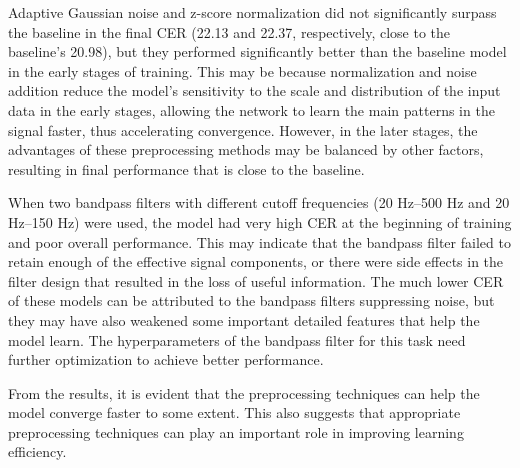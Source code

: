 Adaptive Gaussian noise and z-score normalization did not significantly surpass the baseline in the final CER (22.13 and 22.37, respectively, close to the baseline's 20.98), but they performed significantly better than the baseline model in the early stages of training. This may be because normalization and noise addition reduce the model's sensitivity to the scale and distribution of the input data in the early stages, allowing the network to learn the main patterns in the signal faster, thus accelerating convergence. However, in the later stages, the advantages of these preprocessing methods may be balanced by other factors, resulting in final performance that is close to the baseline.

When two bandpass filters with different cutoff frequencies (20 Hz–500 Hz and 20 Hz–150 Hz) were used, the model had very high CER at the beginning of training and poor overall performance. This may indicate that the bandpass filter failed to retain enough of the effective signal components, or there were side effects in the filter design that resulted in the loss of useful information. The much lower CER of these models can be attributed to the bandpass filters suppressing noise, but they may have also weakened some important detailed features that help the model learn. The hyperparameters of the bandpass filter for this task need further optimization to achieve better performance.

From the results, it is evident that the preprocessing techniques can help the model converge faster to some extent. This also suggests that appropriate preprocessing techniques can play an important role in improving learning efficiency.
